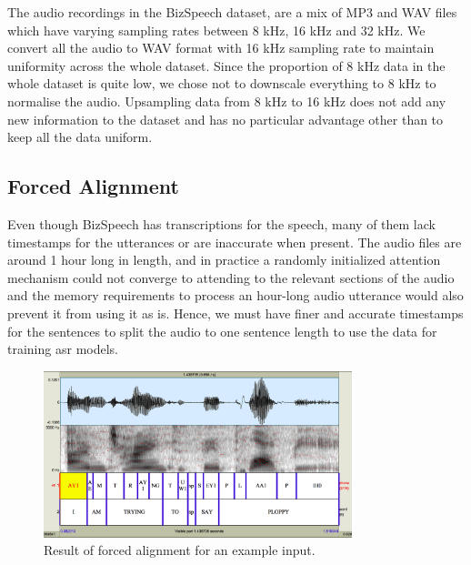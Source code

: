 The audio recordings in the BizSpeech dataset, are a mix of MP3 and WAV files which have varying sampling rates between 8 kHz, 16 kHz and 32 kHz. We convert all the audio to WAV format with 16 kHz sampling rate to maintain uniformity across the whole dataset. Since the proportion of 8 kHz data in the whole dataset is quite low, we chose not to downscale everything to 8 kHz to normalise the audio. Upsampling data from 8 kHz to 16 kHz does not add any new information to the dataset and has no particular advantage other than to keep all the data uniform. 

\subsection{Forced Alignment}
Even though BizSpeech has transcriptions for the speech, many of them lack timestamps for the utterances or are inaccurate when present. The audio files are around 1 hour long in length, and in practice a randomly initialized attention mechanism could not converge to attending to the relevant sections of the audio and the memory requirements to process an hour-long audio utterance would also prevent it from using it as is. Hence, we must have finer and accurate timestamps for the sentences to split the audio to one sentence length to use the data for training \acrshort{asr} models.

\begin{figure}[ht]
  \begin{center}
    \includegraphics[width=0.8\textwidth]{images/ploppy.png} 
    \caption{Result of forced alignment for an example input. \cite{Yuan2008SPEAKERCORPUS}}
    \label{fig:p2fa}
  \end{center}
\end{figure}


